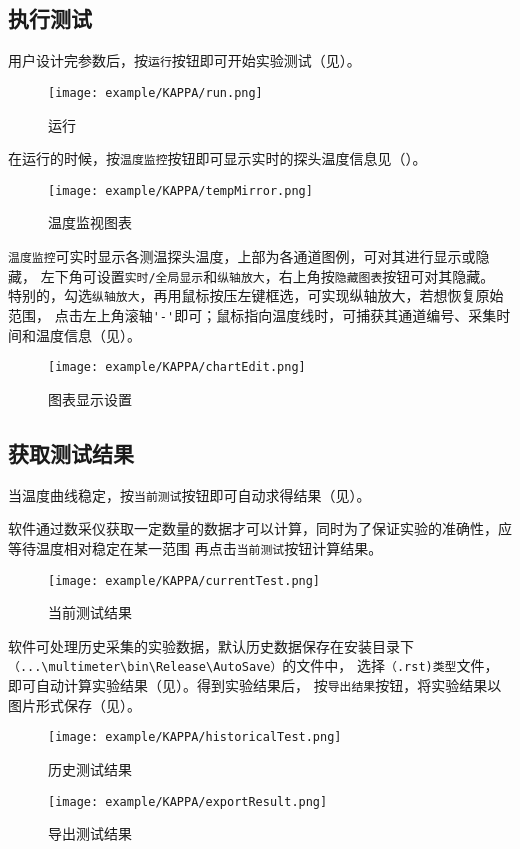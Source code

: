 \subsection{执行测试}
用户设计完参数后，按\lstinline{运行}按钮即可开始实验测试（见）。
\begin{figure}[htbp]
	\centering
	\texttt{[image: example/KAPPA/run.png]}
	\caption{ 运行 \label{fig:exmp_run}}
\end{figure}
在运行的时候，按\lstinline{温度监控}按钮即可显示实时的探头温度信息见（）。
\begin{figure}[htbp]
	\centering
	\texttt{[image: example/KAPPA/tempMirror.png]}
	\caption{ 温度监视图表 \label{fig:exmp_tempMirror}}
\end{figure}
\lstinline{温度监控}可实时显示各测温探头温度，上部为各通道图例，可对其进行显示或隐藏，
左下角可设置\lstinline{实时/全局显示}和\lstinline{纵轴放大}，右上角按\lstinline{隐藏图表}按钮可对其隐藏。
特别的，勾选\lstinline{纵轴放大}，再用鼠标按压左键框选，可实现纵轴放大，若想恢复原始范围，
点击左上角滚轴\lstinline{'-'}即可；鼠标指向温度线时，可捕获其通道编号、采集时间和温度信息（见）。\\
\begin{figure}[htbp]
	\centering
	\texttt{[image: example/KAPPA/chartEdit.png]}
	\caption{ 图表显示设置 \label{fig:exmp_chartEdit}}
\end{figure}

\subsection{获取测试结果}
	当温度曲线稳定，按\lstinline{当前测试}按钮即可自动求得结果（见）。
\begin{note}
	软件通过数采仪获取一定数量的数据才可以计算，同时为了保证实验的准确性，应等待温度相对稳定在某一范围
再点击\lstinline{当前测试}按钮计算结果。
\end{note}
\begin{figure}[htbp]
	\centering
	\texttt{[image: example/KAPPA/currentTest.png]}
	\caption{ 当前测试结果 \label{fig:exmp_currentTest}}
\end{figure}
软件可处理历史采集的实验数据，默认历史数据保存在安装目录下\lstinline{（...\multimeter\bin\Release\AutoSave）}的文件中，
选择\lstinline{（.rst)类型}文件，即可自动计算实验结果（见）。得到实验结果后，
按\lstinline{导出结果}按钮，将实验结果以图片形式保存（见）。
\begin{figure}[htbp]
	\centering
	\texttt{[image: example/KAPPA/historicalTest.png]}
	\caption{ 历史测试结果 \label{fig:exmp_historicalTest}}
\end{figure}

\begin{figure}[htbp]
	\centering
	\texttt{[image: example/KAPPA/exportResult.png]}
	\caption{ 导出测试结果 \label{fig:exmp_exportResult}}
\end{figure}